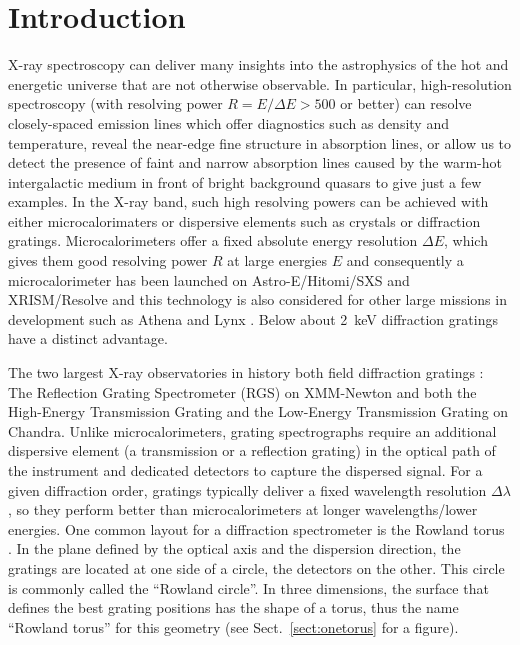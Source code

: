 \documentclass[twocolumn]{aastex631}
\begin{document}


\section{Introduction} \label{sec:intro}
X-ray spectroscopy can deliver many insights into the astrophysics of the hot and energetic universe that are not otherwise observable. In particular, high-resolution spectroscopy (with resolving power $R=E/\Delta E> 500$ or better) can resolve closely-spaced emission lines which offer diagnostics such as density and temperature, reveal the near-edge fine structure in absorption lines, or allow us to detect the presence of faint and narrow absorption lines caused by the warm-hot intergalactic medium in front of bright background quasars to give just a few examples. In the X-ray band, such high resolving powers can be achieved with either microcalorimaters or dispersive elements such as crystals or diffraction gratings. Microcalorimeters offer a fixed absolute energy resolution $\Delta E$, which gives them good resolving power $R$ at large energies $E$ and consequently a microcalorimeter has been launched on Astro-E/Hitomi/SXS \citep{2014SPIE.9144E..2AM} and XRISM/Resolve \citep{2018JATIS...4a1214K} and this technology is also considered for other large missions in development such as Athena \citep{2014SPIE.9144E..2LR} and Lynx \citep{2019JATIS...5b1017B}. Below about 2~keV diffraction gratings have a distinct advantage.

The two largest X-ray observatories in history both field diffraction gratings \citep[see][for a review]{2010SSRv..157...15P}: The Reflection Grating Spectrometer (RGS) on XMM-Newton \citep{2001A&A...365L...7D} and both the High-Energy Transmission Grating  \citep[HETG,][]{2005PASP..117.1144C} and the Low-Energy Transmission Grating \citep[LETG,][]{1997SPIE.3113..172P} on Chandra.
Unlike microcalorimeters, grating spectrographs require an additional dispersive element (a transmission or a reflection grating) in the optical path of the instrument and dedicated detectors to capture the dispersed signal. For a given diffraction order, gratings typically deliver a fixed wavelength resolution $\Delta \lambda$, so they perform better than microcalorimeters at longer wavelengths/lower energies. One common layout for a diffraction spectrometer is the Rowland torus \citep{Beuermann:78}. In the plane defined by the optical axis and the dispersion direction, the gratings are located at one side of a circle, the detectors on the other. This circle is commonly called the ``Rowland circle''. In three dimensions, the surface that defines the best grating positions has the shape of a torus, thus the name ``Rowland torus'' for this geometry (see Sect.~\ref{sect:onetorus} for a figure).
\end{document}
